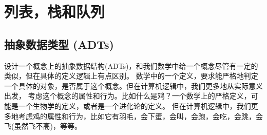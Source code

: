 \documentclass[a4paper]{ctexart}
\theoremstyle{definition}
\theoremstyle{definition}
\begin{document}
\section{列表，栈和队列}




\subsection{抽象数据类型 (ADTs)}



设计一个概念上的抽象数据结构(ADTs)，和我们数学中给一个概念尽管有一定的类似，但在具体的定义逻辑上有点区别。
数学中的一个定义，要求能严格地判定一个具体的对象，是否属于这个概念。但在计算机逻辑中，我们更多地从实际意义出发，
考虑这个概念的属性和行为。比如什么是鸡？一个数学上的严格定义，可能是一个生物学的定义，或者是一个进化论的定义。
但在计算机逻辑中，我们更多地考虑鸡的属性和行为，比如它有羽毛，会下蛋，会叫，会跑，会吃，会跳，会飞(虽然飞不高)，等等。
\end{document}
